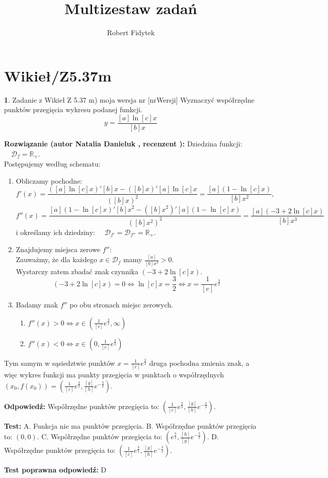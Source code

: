 \documentclass[12pt, a4paper]{article}
\title{Multizestaw zadań}
\author{Robert Fidytek}
\date{}
\theoremstyle{definition} %
\newtheorem{zad}{}
\newcommand{\kategoria}[1]{\section{#1}} %
\newcommand{\zadStart}[1]{\begin{zad}#1\newline} %
\newcommand{\zadStop}{\end{zad}}   %
\newcommand{\rozwStart}[2]{\noindent \textbf{Rozwiązanie (autor #1 , recenzent #2): }\newline} %
\newcommand{\rozwStop}{\newline}                                            %
\newcommand{\odpStart}{\noindent \textbf{Odpowiedź:}\newline}    %
\newcommand{\odpStop}{\newline}                                             %
\newcommand{\testStart}{\noindent \textbf{Test:}\newline} %
\newcommand{\testStop}{\newline} %
\newcommand{\kluczStart}{\noindent \textbf{Test poprawna odpowiedź:}\newline} %
\newcommand{\kluczStop}{\newline} %
\begin{document}
\maketitle

\kategoria{Wikieł/Z5.37m}

\zadStart{Zadanie z Wikieł Z 5.37 m) moja wersja nr [nrWersji]}
Wyznaczyć współrzędne punktów przegięcia wykresu podanej funkcji.
$$y =  \frac{[a]\ln [c]x}{[b]x}$$
\zadStop

\rozwStart{Natalia Danieluk}{}
Dziedzina funkcji: $\quad \mathcal{D}_f=\mathbb{R_+}$. \\
Postępujemy według schematu:
\begin{enumerate}
\item Obliczamy pochodne: 
$$f'(x) = \frac{([a]\ln [c]x)'[b]x-([b]x)'[a]\ln [c]x}{([b]x)^2} = \frac{[a](1-\ln [c]x)}{[b]x^2},$$ 
$$f''(x) = \frac{[a](1-\ln [c]x)'[b]x^2-([b]x^2)'[a](1-\ln [c]x)}{([b]x^2)^2} = \frac{[a](-3+2\ln [c]x)}{[b]x^3}$$
i określamy ich dziedziny: $\quad \mathcal{D}_{f'}=\mathcal{D}_{f''}=\mathbb{R_+}$. \\
\item Znajdujemy miejsca zerowe $f''$: \\
Zauważmy, że dla każdego $x \in \mathcal{D}_f$ mamy $\frac{[a]}{[b]x^3} > 0$. \\
Wystarczy zatem zbadać znak czynnika $(-3+2\ln [c]x)$. \\
$$ (-3+2\ln [c]x) = 0 \Leftrightarrow \ln [c]x = \frac{3}{2} \Leftrightarrow x = \frac{1}{[c]}e^\frac{3}{2} $$
\item Badamy znak $f''$ po obu stronach miejsc zerowych. \\
	\begin{enumerate}
	\item $f''(x) > 0 \Leftrightarrow x \in (\frac{1}{[c]}e^\frac{3}{2},\infty)$\\
	\item $f''(x) < 0 \Leftrightarrow x \in (0,\frac{1}{[c]}e^\frac{3}{2})$
	\end{enumerate}
\end{enumerate}
Tym samym w sąsiedztwie punktów $x=\frac{1}{[c]}e^\frac{3}{2}$ druga pochodna zmienia znak, a więc wykres funkcji ma punkty przegięcia w punktach o współrzędnych $(x_0,f(x_0)) = (\frac{1}{[c]}e^\frac{3}{2},\frac{[g]}{[h]}e^{-\frac{3}{2}})$.
\rozwStop

\odpStart
Współrzędne punktów przegięcia to: $(\frac{1}{[c]}e^\frac{3}{2},\frac{[g]}{[h]}e^{-\frac{3}{2}})$.
\odpStop

\testStart
A. Funkcja nie ma punktów przegięcia.
B. Współrzędne punktów przegięcia to: $(0,0)$.
C. Współrzędne punktów przegięcia to:  $(e^\frac{3}{2},\frac{[h]}{[g]}e^{-\frac{3}{2}})$.
D. Współrzędne punktów przegięcia to:  $(\frac{1}{[c]}e^\frac{3}{2},\frac{[g]}{[h]}e^{-\frac{3}{2}})$.
\testStop

\kluczStart
D
\kluczStop
\end{document}
